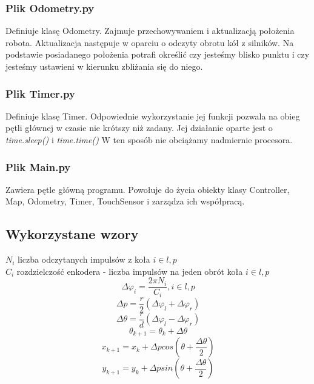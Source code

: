 \documentclass[paper=a4, fontsize=11pt]{scrartcl} %
\numberwithin{equation}{section} %
\numberwithin{figure}{section} %
\numberwithin{table}{section} %
\begin{document}
\subsubsection{Plik Odometry.py}
Definiuje klasę Odometry. Zajmuje przechowywaniem i aktualizacją położenia robota. Aktualizacja następuje w oparciu o odczyty obrotu kół z silników. Na podstawie posiadanego położenia potrafi określić czy jesteśmy blisko punktu i czy jesteśmy ustawieni w kierunku zbliżania się do niego.
\subsubsection{Plik Timer.py}
Definiuje klasę Timer. Odpowiednie wykorzystanie jej funkcji pozwala na obieg pętli głównej w czasie nie krótszy niż zadany. Jej działanie oparte jest o \textit{time.sleep()} i \textit{time.time()}  W ten sposób nie obciążamy nadmiernie procesora.
\subsubsection{Plik Main.py}
Zawiera pętle główną programu. Powołuje do życia obiekty klasy Controller, Map, Odometry, Timer, TouchSensor i zarządza ich współpracą.
\subsection{Wykorzystane wzory}
\(N_i\) liczba odczytanych impulsów z koła \(i \in l, p\)\\
\(C_i\) rozdzielczość enkodera - liczba impulsów na jeden obrót koła \(i \in l, p\)
\[
\Delta \varphi_i = \frac{2\pi N_i}{C_i}, i \in l, p
\]\[
\Delta p = \frac{r}{2} \left( \Delta \varphi_l + \Delta \varphi_r \right)
\]\[
\Delta \theta = \frac{r}{d} \left( \Delta \varphi_l - \Delta \varphi_r \right)
\]\[
\theta_{k+1} = \theta_k + \Delta \theta
\]\[
x_{k+1} = x_k + \Delta p cos\left( \theta + \frac{\Delta \theta}{2} \right)
\]\[
y_{k+1} = y_k + \Delta p sin\left( \theta + \frac{\Delta \theta}{2} \right)
\] 
\end{document}
